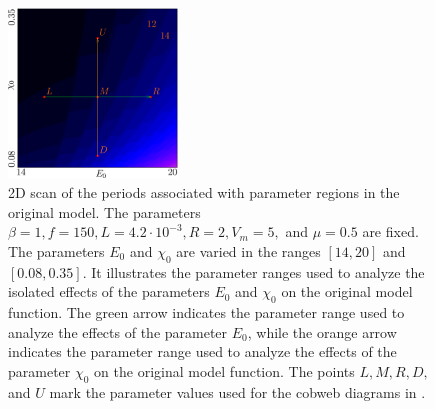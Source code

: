 \begin{figure}
	\centering
	\includegraphics[width=0.4\textwidth]{../Figures/5/5.3/result.png}
	\caption[The parameter ranges examined to analyze the isolated effects of parameters on the original model function]{
		2D scan of the periods associated with parameter regions in the original model.
		The parameters $\beta = 1, f = 150, L = 4.2 \cdot 10^{-3}, R = 2, V_m = 5,$ and $\mu = 0.5$ are fixed.
		The parameters $E_0$ and $\chi_0$ are varied in the ranges $[14, 20]$ and $[0.08, 0.35]$.
		It illustrates the parameter ranges used to analyze the isolated effects of the parameters $E_0$ and $\chi_0$ on the original model function.
		The green arrow indicates the parameter range used to analyze the effects of the parameter $E_0$, while the orange arrow indicates the parameter range used to analyze the effects of the parameter $\chi_0$ on the original model function.
		The points $L, M, R, D,$ and $U$ mark the parameter values used for the cobweb diagrams in .
	}
	\label{fig:setup.char.evolution.single.map}
\end{figure}

